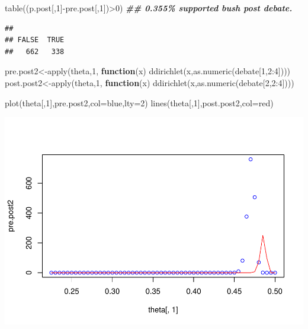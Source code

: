 \documentclass[
]{book}
\newenvironment{Shaded}{\begin{snugshade}}{\end{snugshade}}
\newcommand{\AttributeTok}[1]{\textcolor[rgb]{0.77,0.63,0.00}{#1}}
\newcommand{\ControlFlowTok}[1]{\textcolor[rgb]{0.13,0.29,0.53}{\textbf{#1}}}
\newcommand{\DecValTok}[1]{\textcolor[rgb]{0.00,0.00,0.81}{#1}}
\newcommand{\DocumentationTok}[1]{\textcolor[rgb]{0.56,0.35,0.01}{\textbf{\textit{#1}}}}
\newcommand{\FunctionTok}[1]{\textcolor[rgb]{0.00,0.00,0.00}{#1}}
\newcommand{\NormalTok}[1]{#1}
\newcommand{\OtherTok}[1]{\textcolor[rgb]{0.56,0.35,0.01}{#1}}
\newcommand{\SpecialCharTok}[1]{\textcolor[rgb]{0.00,0.00,0.00}{#1}}
\newcommand{\StringTok}[1]{\textcolor[rgb]{0.31,0.60,0.02}{#1}}
\theoremstyle{definition}
\theoremstyle{definition}
\theoremstyle{definition}
\theoremstyle{definition}
\theoremstyle{remark}
\begin{document}
\begin{Shaded}
\begin{Highlighting}[]
   \FunctionTok{table}\NormalTok{((p.post[,}\DecValTok{1}\NormalTok{]}\SpecialCharTok{{-}}\NormalTok{pre.post[,}\DecValTok{1}\NormalTok{])}\SpecialCharTok{\textgreater{}}\DecValTok{0}\NormalTok{) }\DocumentationTok{\#\# 0.355\% supported bush post debate.}
\end{Highlighting}
\end{Shaded}

\begin{verbatim}
## 
## FALSE  TRUE 
##   662   338
\end{verbatim}

\begin{Shaded}
\begin{Highlighting}[]
\NormalTok{ pre.post2}\OtherTok{\textless{}{-}}\FunctionTok{apply}\NormalTok{(theta,}\DecValTok{1}\NormalTok{, }\ControlFlowTok{function}\NormalTok{(x) }\FunctionTok{ddirichlet}\NormalTok{(x,}\FunctionTok{as.numeric}\NormalTok{(debate[}\DecValTok{1}\NormalTok{,}\DecValTok{2}\SpecialCharTok{:}\DecValTok{4}\NormalTok{])))}
\NormalTok{ post.post2}\OtherTok{\textless{}{-}}\FunctionTok{apply}\NormalTok{(theta,}\DecValTok{1}\NormalTok{, }\ControlFlowTok{function}\NormalTok{(x) }\FunctionTok{ddirichlet}\NormalTok{(x,}\FunctionTok{as.numeric}\NormalTok{(debate[}\DecValTok{2}\NormalTok{,}\DecValTok{2}\SpecialCharTok{:}\DecValTok{4}\NormalTok{])))}
 
  \FunctionTok{plot}\NormalTok{(theta[,}\DecValTok{1}\NormalTok{],pre.post2,}\AttributeTok{col=}\StringTok{\textquotesingle{}blue\textquotesingle{}}\NormalTok{,}\AttributeTok{lty=}\DecValTok{2}\NormalTok{)}
  \FunctionTok{lines}\NormalTok{(theta[,}\DecValTok{1}\NormalTok{],post.post2,}\AttributeTok{col=}\StringTok{\textquotesingle{}red\textquotesingle{}}\NormalTok{)}
\end{Highlighting}
\end{Shaded}

\includegraphics{_main_files/figure-latex/unnamed-chunk-30-2.pdf}
\end{document}
